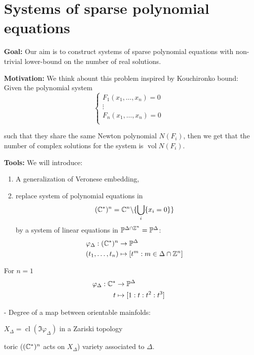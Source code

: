 \chapter{Systems of sparse polynomial equations}

 
\textbf{Goal:} Our aim is to construct systems of sparse polynomial equations with non-trivial lower-bound on the number of real solutions.

\textbf{Motivation:} We think abount this problem inspired by Kouchironko bound: Given the polynomial system
$$\begin{cases}
F_1(x_1,\dots,x_n) = 0\\
\vdots\\
F_n(x_1,\dots,x_n) = 0\\
\end{cases}$$

such that they share the same Newton polynomial $N(F_i)$, then we get that the number of complex solutions for the system is $\operatorname{vol} N(F_i)$.


\textbf{Tools:} We will introduce:
\begin{enumerate}
\item A generalization of Veronese embedding,
\item replace system of polynomial equations in
$$(\mathbb{C}^*)^n = \mathbb{C}^n \backslash \{\bigcup_i\{x_i = 0\}\}$$
by a system of linear equations in $\mathbb{P}^{\Delta \cap \mathbb{Z}^n} = \mathbb{P}^\Delta$:
\begin{align*}
\varphi_\Delta : (\mathbb{C}^*)^n  &\to \mathbb{P}^\Delta\\
(t_1,\dots,t_n) &\mapsto [t^m : m\in \Delta \cap \mathbb{Z}^n]
\end{align*}
\end{enumerate}

\begin{example}
For $n = 1$
\begin{align*}
\varphi_\Delta : \mathbb{C}^*  &\to \mathbb{P}^\Delta\\
t &\mapsto [1:t:t^2:t^3]
\end{align*}
\end{example}

- Degree of a map between orientable mainfolds:

$X_\Delta = \operatorname{cl}(\Im \varphi_\Delta)$ in a Zariski topology

toric ($(\mathbb{C}^*)^n$ acts on $X_\Delta$) variety associated to $\Delta$.



